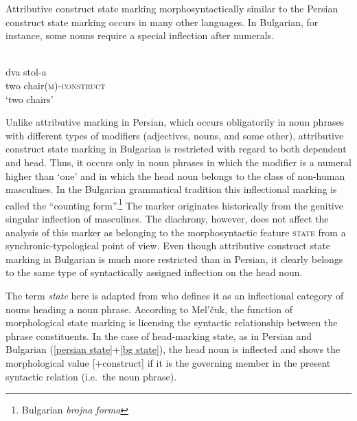 Attributive construct state marking morphosyntactically similar to the Persian construct state marking occurs in many other languages. In Bulgarian, for instance, some nouns require a special inflection after numerals.
\begin{exe}
\ex 
{}\\
\label{bg state}
\gll 	dva 	stol-a\\
	two	chair{\textsc{(m)-construct}}\\
\glt 	‘two chairs’
\end{exe}
Unlike attributive  marking in Persian, which occurs obligatorily in noun phrases with different types of modifiers (adjectives, nouns, and some other), attributive construct state marking in Bulgarian is restricted with regard to both dependent and head. Thus, it occurs only in noun phrases in which the modifier is a numeral higher than ‘one’ and in which the head noun belongs to the class of non-human masculines. In the Bulgarian grammatical tradition this inflectional marking is called the “counting form”.\footnote{Bulgarian \emph{brojna forma}} The marker originates historically from the genitive singular inflection of masculines. The diachrony, however, does not affect the analysis of this marker as belonging to the morphosyntactic feature \textsc{state} from a synchronic-typological point of view. Even though attributive construct state marking in Bulgarian is much more restricted than in Persian, it clearly belongs to the same type of syntactically assigned inflection on the head noun.

The term \emph{state} here is adapted from \citet[114–116]{melcuk2006} who defines it as an inflectional category of nouns heading a noun phrase. According to Mel'čuk, the function of morphological state marking is licensing the syntactic relationship between the phrase constituents. In the case of head-marking state, as in Persian and Bulgarian (\ref{persian state}+\ref{bg state}), the head noun is inflected and shows the morphological value [+construct] if it is the governing member in the present syntactic relation (i.e.~the noun phrase). 

